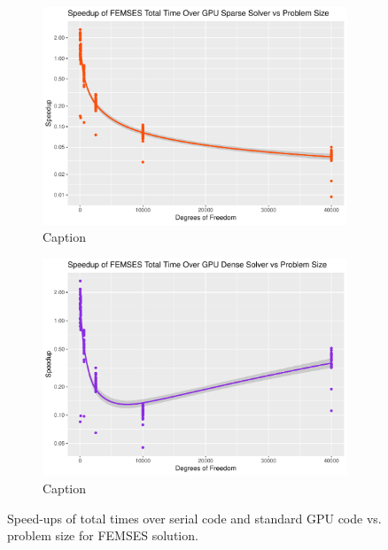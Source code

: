 \begin{figure}
\begin{subfigure}{0.48\linewidth}
		\includegraphics[width=\linewidth]{Plots/total_femses_gpu_sparse_speedup_vs_n}
		\caption{Caption}
		\label{fig:tot_femses_gpu_sparse}
	\end{subfigure}\hfill
	\begin{subfigure}{0.48\linewidth}
		\centering
		\includegraphics[width=\linewidth]{Plots/total_femses_gpu_dense_speedup_vs_n}
		\caption{Caption}
		\label{fig:tot_femses_gpu_dense}
	\end{subfigure}
	\caption{Speed-ups of total times over serial code and standard GPU code vs. problem size for FEMSES solution.}
	\label{fig:tot_femses}
\end{figure}

